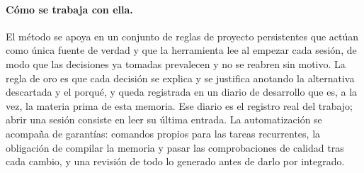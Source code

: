 \paragraph{Cómo se trabaja con ella.}
El método se apoya en un conjunto de reglas de proyecto persistentes que actúan como única fuente de verdad y que la herramienta lee al empezar cada sesión, de modo que las decisiones ya tomadas prevalecen y no se reabren sin motivo.
La regla de oro es que cada decisión se explica y se justifica anotando la alternativa descartada y el porqué, y queda registrada en un diario de desarrollo que es, a la vez, la materia prima de esta memoria.
Ese diario es el registro real del trabajo; abrir una sesión consiste en leer su última entrada.
La automatización se acompaña de garantías: comandos propios para las tareas recurrentes, la obligación de compilar la memoria y pasar las comprobaciones de calidad tras cada cambio, y una revisión de todo lo generado antes de darlo por integrado.

